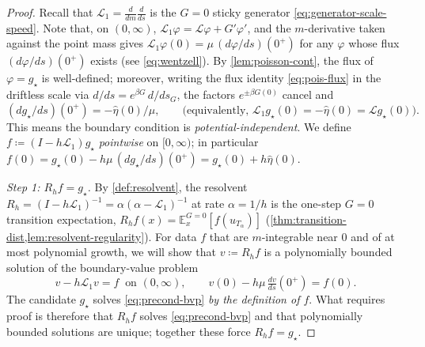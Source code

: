 \documentclass[aap,preprint]{imsart}
\numberwithin{equation}{section}
\theoremstyle{plain}
\theoremstyle{definition}
\begin{document}
\begin{proof}
  Recall that $\mathcal L_1=\frac{d}{dm}\frac{d}{ds}$ is the $G=0$ sticky generator \eqref{eq:generator-scale-speed}.  Note that, on $(0,\infty)$,  $\mathcal L_1\varphi=\mathcal L\varphi+G'\varphi'$, and the $m$-derivative taken against the point mass gives $\mathcal L_1\varphi(0)=\mu\,(d\varphi/ds)(0^+)$ for any $\varphi$ whose flux $(d\varphi/ds)(0^+)$ exists (see \cref{eq:wentzell}). By \cref{lem:poisson-cont}, the flux of  $\varphi=g_\star$ is well-defined; moreover, writing the flux identity \cref{eq:pois-flux} in the driftless scale via $d/ds=e^{\beta G}\,d/ds_G$, the factors $e^{\pm\beta G(0)}$ cancel and
  \begin{equation}\label{eq:flux-driftless}
    (dg_\star/ds)(0^+)=-\hat\eta(0)/\mu,
    \qquad\text{(equivalently, $\mathcal L_1g_\star(0)=-\hat\eta(0)=\mathcal Lg_\star(0)$)}.
  \end{equation}
  This means the boundary condition is \emph{potential-independent}.  We define $f\coloneqq (I-h\mathcal L_1)g_\star$ \emph{pointwise} on $[0,\infty)$; in particular $f(0)=g_\star(0)-h\mu\,(dg_\star/ds)(0^+)=g_\star(0)+h\hat\eta(0)$.

  \emph{Step 1: $R_hf=g_\star$.}  By \cref{def:resolvent}, the resolvent $R_h=(I-h\mathcal L_1)^{-1}=\alpha(\alpha-\mathcal L_1)^{-1}$ at rate $\alpha=1/h$ is the one-step $G=0$ transition expectation, $R_hf(x)=\mathbb E^{G=0}_x[f(u_{T_\alpha})]$ (\cref{thm:transition-dist,lem:resolvent-regularity}).  For data $f$ that are $m$-integrable near $0$ and of at most polynomial growth, we will show that  $v\coloneqq R_hf$ is a polynomially bounded solution of the boundary-value problem
  \begin{equation}\label{eq:precond-bvp}
    v-h\mathcal L_1v=f\ \text{  on }(0,\infty),
    \qquad
    v(0)-h\mu\,\tfrac{dv}{ds}(0^+)=f(0).
  \end{equation}
    The candidate $g_\star$ solves \cref{eq:precond-bvp} \emph{by the definition of $f$}.  What requires proof is therefore that $R_hf$ solves \cref{eq:precond-bvp} and that polynomially bounded solutions are unique; together these force $R_hf=g_\star$.


\end{proof}
\end{document}
